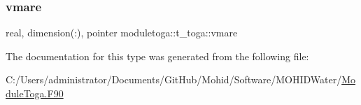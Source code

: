 \mbox{\label{structmoduletoga_1_1t__toga_ad587684e16b415cb69923ac181859293}} 
\subsubsection{\texorpdfstring{vmare}{vmare}}
{\footnotesize\ttfamily real, dimension(\+:), pointer moduletoga\+::t\+\_\+toga\+::vmare\hspace{0.3cm}{\ttfamily [private]}}



The documentation for this type was generated from the following file\+:\begin{DoxyCompactItemize}
\item 
C\+:/\+Users/administrator/\+Documents/\+Git\+Hub/\+Mohid/\+Software/\+M\+O\+H\+I\+D\+Water/\mbox{\hyperlink{_module_toga_8_f90}{Module\+Toga.\+F90}}\end{DoxyCompactItemize}
